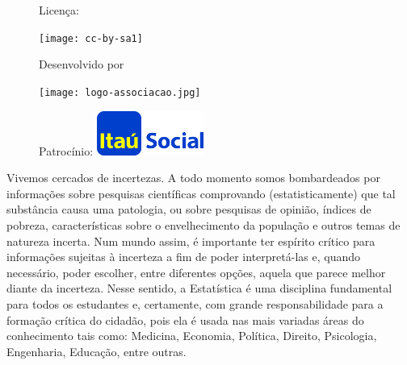 \begin{figure}[b]
\begin{minipage}[l]{5cm}
\centering

{\large Licença:}

  \texttt{[image: cc-by-sa1]}
\end{minipage}\hfill
\begin{minipage}[c]{5cm}
\centering
{\large Desenvolvido por}

\texttt{[image: logo-associacao.jpg]}
\end{minipage}
\begin{minipage}[r]{5cm}
\centering

{\large Patrocínio:}
  \vspace{1em}
  \includegraphics[width=3.5cm]{itau}
\end{minipage}
\end{figure}

\mainmatter

\label{est1-exp-1}
Vivemos cercados de incertezas. A todo momento somos bombardeados por informações sobre pesquisas científicas comprovando (estatisticamente) que tal substância causa uma patologia, ou sobre pesquisas de opinião, índices de pobreza, características sobre o envelhecimento da população e outros temas de natureza incerta. Num mundo assim, é importante ter espírito crítico para informações sujeitas à incerteza a fim de poder interpretá-las e, quando necessário, poder escolher, entre diferentes opções, aquela que parece melhor diante da incerteza. Nesse sentido, a Estatística é uma disciplina fundamental para todos os estudantes e, certamente, com grande responsabilidade para a formação crítica do cidadão, pois ela é usada nas mais variadas áreas do conhecimento tais como: Medicina, Economia, Política, Direito, Psicologia, Engenharia, Educação, entre outras.

